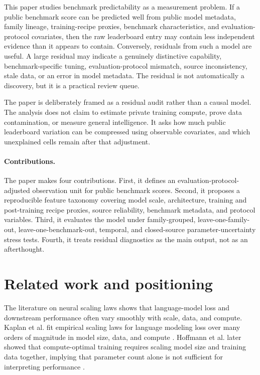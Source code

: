 \documentclass[11pt]{article}
\begin{document}
This paper studies benchmark predictability as a measurement problem. If a public benchmark score can be predicted well from public model metadata, family lineage, training-recipe proxies, benchmark characteristics, and evaluation-protocol covariates, then the raw leaderboard entry may contain less independent evidence than it appears to contain. Conversely, residuals from such a model are useful. A large residual may indicate a genuinely distinctive capability, benchmark-specific tuning, evaluation-protocol mismatch, source inconsistency, stale data, or an error in model metadata. The residual is not automatically a discovery, but it is a practical review queue.

The paper is deliberately framed as a residual audit rather than a causal model. The analysis does not claim to estimate private training compute, prove data contamination, or measure general intelligence. It asks how much public leaderboard variation can be compressed using observable covariates, and which unexplained cells remain after that adjustment.

\paragraph{Contributions.} The paper makes four contributions. First, it defines an evaluation-protocol-adjusted observation unit for public benchmark scores. Second, it proposes a reproducible feature taxonomy covering model scale, architecture, training and post-training recipe proxies, source reliability, benchmark metadata, and protocol variables. Third, it evaluates the model under family-grouped, leave-one-family-out, leave-one-benchmark-out, temporal, and closed-source parameter-uncertainty stress tests. Fourth, it treats residual diagnostics as the main output, not as an afterthought.

\section{Related work and positioning}
The literature on neural scaling laws shows that language-model loss and downstream performance often vary smoothly with scale, data, and compute. Kaplan et al. fit empirical scaling laws for language modeling loss over many orders of magnitude in model size, data, and compute \citep{kaplan2020scaling}. Hoffmann et al. later showed that compute-optimal training requires scaling model size and training data together, implying that parameter count alone is not sufficient for interpreting performance \citep{hoffmann2022training}.
\end{document}
